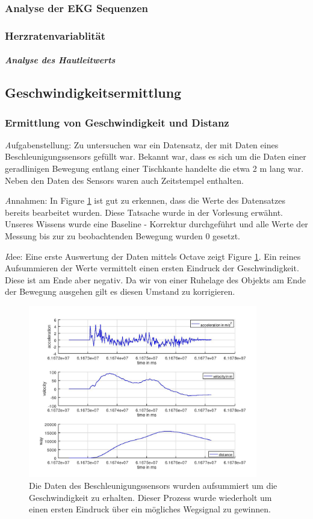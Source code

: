 \documentclass[12pt]{article}
\begin{document}
\subsubsection{Analyse der EKG Sequenzen}

\subsubsection{Herzratenvariablität}

\subparagraph{Analyse des Hautleitwerts}

\newpage
\subsection{Geschwindigkeitsermittlung}
\label{sec:Geschwindigkeitsermittlung}
\subsubsection{Ermittlung von Geschwindigkeit und Distanz}
\textit Aufgabenstellung:
Zu untersuchen war ein Datensatz, der mit Daten eines Beschleunigungssensors gefüllt war. Bekannt war, dass es sich um die Daten einer geradlinigen Bewegung entlang einer Tischkante handelte die etwa 2 m lang war. Neben den Daten des Sensors waren auch Zeitstempel enthalten. 

\textit Annahmen:
In Figure \ref{fig:plainData} ist gut zu erkennen, dass die Werte des Datensatzes bereits bearbeitet wurden. Diese Tatsache wurde in der Vorlesung erwähnt. Unseres Wissens wurde eine Baseline - Korrektur durchgeführt und alle Werte der Messung bis zur zu beobachtenden Bewegung wurden 0 gesetzt. 

\textit Idee:
Eine erste Auswertung der Daten mittels Octave zeigt Figure \ref{fig:plainData}. Ein reines Aufsummieren der Werte vermittelt einen ersten Eindruck der Geschwindigkeit.
Diese ist am Ende aber negativ. Da wir von einer Ruhelage des Objekts am Ende der Bewegung ausgehen gilt es diesen Umstand zu korrigieren. 

\begin{figure}[H]
	\centering
	\includegraphics[width=10cm]{images/testData.jpg}
	\caption{Die Daten des Beschleunigungssensors wurden aufsummiert um die Geschwindigkeit zu erhalten. Dieser Prozess wurde wiederholt um einen ersten Eindruck über ein mögliches Wegsignal zu gewinnen.}
	\label{fig:plainData}
\end{figure}
\end{document}

